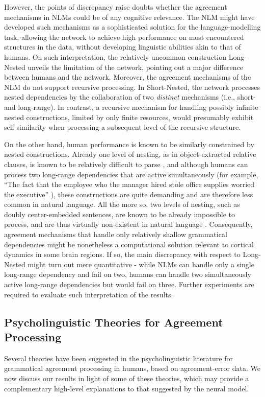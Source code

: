 However, the points of discrepancy raise doubts whether the agreement mechanisms in NLMs could be of any cognitive relevance. The NLM might have developed such mechanisms as a sophisticated solution for the language-modelling task, allowing the network to achieve high performance on most encountered structures in the data, without developing linguistic abilities akin to that of humans. On such interpretation, the relatively uncommon construction Long-Nested unveils the limitation of the network, pointing out a major difference between humans and the network. Moreover, the agreement mechanisms of the NLM do not support recursive processing. In Short-Nested, the network processes nested dependencies by the collaboration of two \textit{distinct} mechanisms (i.e., short- and long-range). In contrast, a recursive mechanism for handling possibly infinite nested constructions, limited by only finite resources, would presumably exhibit self-similarity when processing a subsequent level of the recursive structure.

On the other hand, human performance is known to be similarly constrained by nested constructions. Already one level of nesting, as in object-extracted relative clauses, is known to be relatively difficult to parse \citep[e.g.,][]{traxler2002processing}, and although humans can process two long-range dependencies that are active simultaneously (for example, ``The fact that the employee who the manager hired stole office supplies worried the executive'' \citep{Gibson:1998}), these constructions are quite demanding and are therefore less common in natural language. All the more so, two levels of nesting, such as doubly center-embedded sentences, are known to be already impossible to process, and are thus virtually non-existent in natural language \citep{}. Consequently, agreement mechanisms that handle only relatively shallow grammatical dependencies might be nonetheless a computational solution relevant to cortical dynamics in some brain regions. If so, the main discrepancy with respect to Long-Nested might turn out mere quantitative - while NLMs can handle only a single long-range dependency and fail on two, humans can handle two simultaneously active long-range dependencies but would fail on three. Further experiments are required to evaluate such interpretation of the results.


\subsection{Psycholinguistic Theories for Agreement Processing}
Several theories have been suggested in the psycholinguistic literature for grammatical agreement processing in humans, based on agreement-error data. We now discuss our results in light of some of these theories, which may provide a complementary high-level explanations to that suggested by the neural model. 

